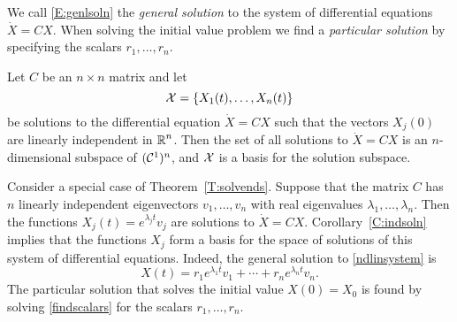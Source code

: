 \documentclass{ximera}
\begin{document}
We call \eqref{E:genlsoln} the {\em general solution\/} 
to the system of differential equations $\dot{X}=CX$.  When solving the
initial value problem we find a {\em particular solution\/}
by specifying the scalars $r_1,\ldots,r_n$.

\begin{corollary}  \label{C:indsoln}
  Let $C$ be an $n\times n$ matrix and let \[
    {\cal X}=\{X_1(t),\ldots,X_n(t)\}\]
be solutions to the differential equation $\dot{X}=CX$ such that the vectors
$X_j(0)$ are linearly independent in $\mbox{$\Bbb{R}$}^n$.  Then the set of all solutions
to $\dot{X}=CX$ is an $n$-dimensional subspace of $({\cal C}^1)^n$, and
${\cal X}$ is a basis for the solution subspace.
\end{corollary}

Consider a special case of Theorem~\ref{T:solvends}.  Suppose that the
matrix $C$ has $n$ linearly independent eigenvectors $v_1,\ldots,v_n$ with
real eigenvalues $\lambda_1,\ldots,\lambda_n$.  Then the functions
$X_j(t)=e^{\lambda_j t}v_j$ are solutions to $\dot{X}=CX$.
Corollary~\ref{C:indsoln} implies that the functions $X_j$ form a basis for
the space of solutions of this system of differential equations.  Indeed,
the general solution to \eqref{ndlinsystem} is
\begin{equation}  \label{e:gensoln}
X(t) = r_1e^{\lambda_1 t}v_1 + \cdots + r_ne^{\lambda_n t}v_n.
\end{equation}
The particular solution that solves the initial value $X(0)=X_0$ is found by
solving \eqref{findscalars} for the scalars $r_1,\ldots,r_n$.





\EXER

\TEXER
\end{document}
